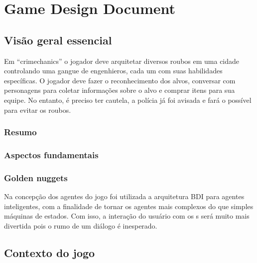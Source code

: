 \chapter{Game Design Document}\label{ap:gdd}


\section{Visão geral essencial}
Em ``crimechanics'' o jogador deve arquitetar diversos roubos em uma cidade controlando uma gangue de engenhieros, cada um com suas habilidades específicas. O jogador deve fazer o reconhecimento dos alvos, conversar com personagens para coletar informações sobre o alvo e comprar itens para sua equipe. No entanto, é preciso ter cautela, a polícia já foi avisada e fará o possível para evitar os roubos.

\subsection{Resumo}

\subsection{Aspectos fundamentais}

\subsection{Golden nuggets}
Na concepção dos agentes do jogo foi utilizada a arquitetura BDI para agentes inteligentes, com a finalidade de tornar os agentes mais complexos do que simples máquinas de estados. Com isso, a interação do usuário com os \npc{}s será muito mais divertida pois o rumo de um diálogo é inesperado.

\section{Contexto do jogo}
